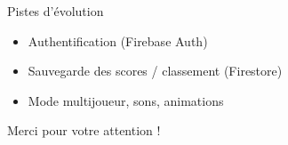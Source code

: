 \documentclass[aspectratio=169]{beamer}
\begin{document}
\begin{frame}{Pistes d'évolution}
  \begin{itemize}
    \item Authentification (Firebase Auth)
    \item Sauvegarde des scores / classement (Firestore)
    \item Mode multijoueur, sons, animations
  \end{itemize}

  \vspace{1cm}
  \centering \Large Merci pour votre attention !
\end{frame}
\end{document}
